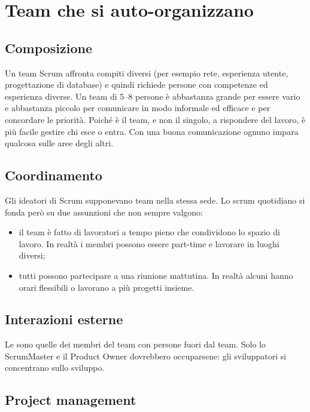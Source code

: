 \section{Team che si auto-organizzano}
\label{sec:agile-team}

\subsection*{Composizione}

Un team Scrum affronta compiti diversi (per esempio rete, esperienza utente, progettazione di database) e quindi
richiede persone con competenze ed esperienza diverse. Un team di 5--8 persone è abbastanza grande per essere vario
e abbastanza piccolo per comunicare in modo informale ed efficace e per concordare le priorità. Poiché è il team, e
non il singolo, a rispondere del lavoro, è più facile gestire chi esce o entra. Con una buona comunicazione ognuno
impara qualcosa sulle aree degli altri.

\subsection*{Coordinamento}

Gli ideatori di Scrum supponevano team nella stessa sede. Lo scrum quotidiano si fonda però su due assunzioni che
non sempre valgono:
\begin{itemize}
  \item il team è fatto di lavoratori a tempo pieno che condividono lo spazio di lavoro. In realtà i membri possono
    essere part-time e lavorare in luoghi diversi;
  \item tutti possono partecipare a una riunione mattutina. In realtà alcuni hanno orari flessibili o lavorano a
    più progetti insieme.
\end{itemize}

\subsection*{Interazioni esterne}

Le  sono quelle dei membri del team con persone fuori dal team. Solo lo ScrumMaster e il
Product Owner dovrebbero occuparsene: gli sviluppatori si concentrano sullo sviluppo.

\subsection*{Project management}

